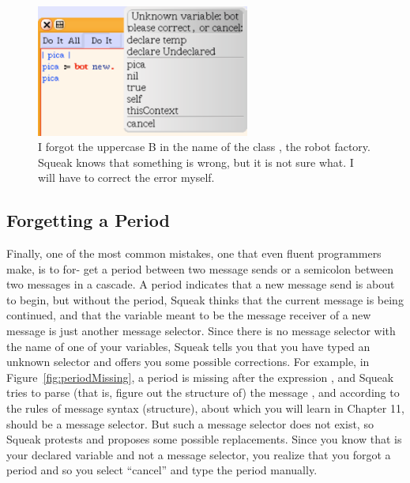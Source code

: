 \documentclass[a4paper,10pt,twoside]{book}
\begin{document}
\begin{figure}
\begin{center}\includegraphics[width=7cm]{BMissing}
\caption{I forgot the uppercase B in the name of the class , the robot factory. Squeak knows 
that something is wrong, but it is not sure what. I will have to correct the error myself. \label{fig:TMissing}}\end{center}
\end{figure}

\subsection{Forgetting a Period}
Finally, one of the most common mistakes, one that even fluent programmers make, is to for- 
get a period between two message sends or a semicolon between two messages in a cascade. 
A period indicates that a new message send is about to begin, but without the period, Squeak 
thinks that the current message is being continued, and that the variable meant to be the 
message receiver of a new message is just another message selector. Since there is no message 
selector with the name of one of your variables, Squeak tells you that you have typed an 
unknown selector and offers you some possible corrections. For example, in Figure~\ref{fig:periodMissing}, a 
period is missing after the expression , and Squeak tries to parse (that is, 
figure out the structure of) the message , and according to the 
rules of message syntax (structure), about which you will learn in Chapter 11,  should be a 
message selector. But such a message selector does not exist, so Squeak protests and proposes 
some possible replacements. Since you know that  is your declared variable and not a 
message selector, you realize that you forgot a period and so you select “cancel” and type the 
period manually. 
\end{document}
